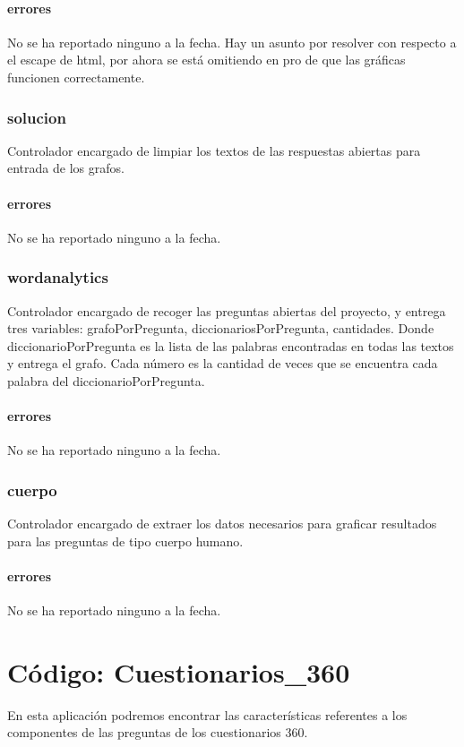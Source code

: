 \documentclass[10pt,a4paper]{book}
\begin{document}
	\subsubsection{errores}
	No se ha reportado ninguno a la fecha. Hay un asunto por resolver con respecto a el escape de html, por ahora se está omitiendo en pro de que las gráficas funcionen correctamente.

	\subsection{solucion}
	Controlador encargado de limpiar los textos de las respuestas abiertas para entrada de los grafos.
	\subsubsection{errores}
	No se ha reportado ninguno a la fecha.

	\subsection{wordanalytics}
	Controlador encargado de recoger las preguntas abiertas del proyecto, y entrega tres variables: grafoPorPregunta, diccionariosPorPregunta, cantidades. Donde diccionarioPorPregunta es la lista de las palabras encontradas en todas las textos y entrega el grafo. Cada número es la cantidad de veces que se encuentra cada palabra del diccionarioPorPregunta.
	\subsubsection{errores}
	No se ha reportado ninguno a la fecha.

	\subsection{cuerpo}
	Controlador encargado de extraer los datos necesarios para graficar resultados para las preguntas de tipo cuerpo humano.
	\subsubsection{errores}
	No se ha reportado ninguno a la fecha.


	\chapter{Código: Cuestionarios\_360}

	En esta aplicación podremos encontrar las características referentes a los componentes de las preguntas de los cuestionarios 360.
\end{document}
